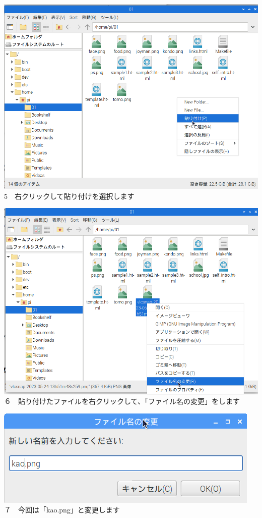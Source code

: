 \documentclass[a4paper,12pt]{jarticle}
\begin{document}
\bigskip


\bigskip

\centering
\begin{minipage}{0.45\linewidth}
  \includegraphics[width=\linewidth]{textbook-img168.png}\\
  5　右クリックして貼り付けを選択します
\end{minipage}
\hfill
\vspace{20pt}
\begin{minipage}{0.45\linewidth}
  \includegraphics[width=\linewidth]{textbook-img169.png}\\
  ６　貼り付けたファイルを右クリックして、「ファイル名の変更」をします
\end{minipage}
\begin{minipage}{0.45\linewidth}
  \includegraphics[width=\linewidth]{textbook-img166.png}\\
  ７　今回は「kao.png」と変更します
\end{minipage}
\end{document}
